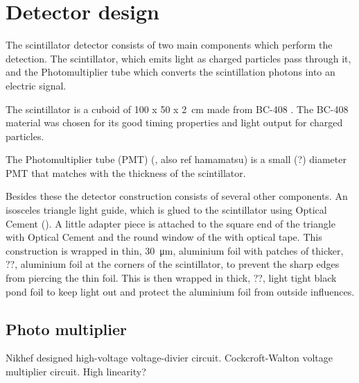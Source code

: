 \section{Detector design}

The scintillator detector consists of two main components which perform the
detection. The scintillator, which emits light as charged particles pass
through it, and the Photomultiplier tube which converts the scintillation
photons into an electric signal.

The scintillator is a cuboid of \SI[product-units=power]{100 x 50 x
2}{\centi\meter} made from BC-408 \cite{bc408}. The BC-408 material was
chosen for its good timing properties and light output for charged particles.

The Photomultiplier tube (PMT) (\cite{et:pmt}, also ref hamamatsu) is a small
(?) diameter PMT that matches with the thickness of the scintillator.

Besides these the detector construction consists of several other components.
An isosceles triangle light guide, which is glued to the scintillator using
Optical Cement (\cite{bc600}). A little adapter piece is attached to the square
end of the triangle with Optical Cement and the round window of the \pmt with
optical tape. This construction is wrapped in thin, \SI{30}{\micro\meter},
aluminium foil with patches of thicker, ??, aluminium foil at the corners of
the scintillator, to prevent the sharp edges from piercing the thin foil. This
is then wrapped in thick, ??, light tight black pond foil to keep light out and
protect the aluminium foil from outside influences.


\subsection{Photo multiplier}

Nikhef designed high-voltage voltage-divier circuit.
Cockcroft-Walton voltage multiplier circuit.
High linearity?

\cite{et:pmt}
